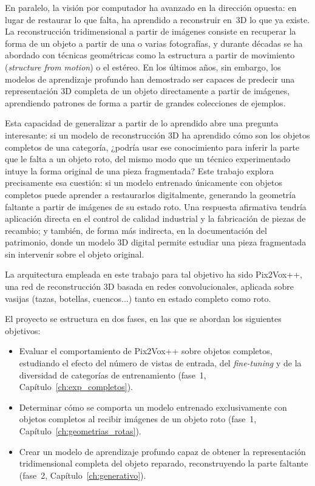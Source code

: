 \documentclass[10pt,a4paper]{report}
\begin{document}
En paralelo, la visión por computador ha avanzado en la dirección opuesta: en lugar de
restaurar lo que falta, ha aprendido a reconstruir en~3D lo que ya existe.
La reconstrucción tridimensional a partir de imágenes consiste en recuperar la forma de
un objeto a partir de una o varias fotografías, y durante décadas se ha
abordado con técnicas geométricas como la estructura a partir de movimiento
(\textit{structure from motion}) o el estéreo.
En los últimos años, sin embargo, los modelos de aprendizaje profundo han demostrado ser
capaces de predecir una representación 3D completa de un objeto directamente a partir de
imágenes, aprendiendo patrones de forma a partir de grandes colecciones de ejemplos.

Esta capacidad de generalizar a partir de lo aprendido abre una pregunta interesante:
si un modelo de reconstrucción 3D ha aprendido cómo son los objetos completos de una
categoría, ¿podría usar ese conocimiento para inferir la parte que le falta a un objeto
roto, del mismo modo que un técnico experimentado intuye la forma original de una pieza
fragmentada?
Este trabajo explora precisamente esa cuestión: si un modelo entrenado únicamente con
objetos completos puede aprender a restaurarlos digitalmente, generando la geometría
faltante a partir de imágenes de su estado roto.
Una respuesta afirmativa tendría aplicación directa en el control de calidad industrial
y la fabricación de piezas de recambio; y también, de forma más indirecta, en la
documentación del patrimonio, donde un modelo 3D digital permite estudiar una pieza
fragmentada sin intervenir sobre el objeto original.

La arquitectura empleada en este trabajo para tal objetivo ha sido Pix2Vox++,
una red de reconstrucción 3D basada en redes convolucionales, aplicada sobre vasijas (tazas, botellas, cuencos...) tanto en estado completo como roto.

El proyecto se estructura en dos fases, en las que se abordan los siguientes objetivos:
\begin{itemize}
  \item Evaluar el comportamiento de Pix2Vox++ sobre objetos completos, estudiando el
        efecto del número de vistas de entrada, del \textit{fine-tuning} y de la
        diversidad de categorías de entrenamiento (fase~1,
        Capítulo~\ref{ch:exp_completos}).
  \item Determinar cómo se comporta un modelo entrenado exclusivamente con objetos
        completos al recibir imágenes de un objeto roto (fase~1,
        Capítulo~\ref{ch:geometrias_rotas}).
  \item Crear un modelo de aprendizaje profundo capaz de obtener la representación
        tridimensional completa del objeto reparado, reconstruyendo la parte faltante (fase~2,
        Capítulo~\ref{ch:generativo}).
\end{itemize}
\end{document}
